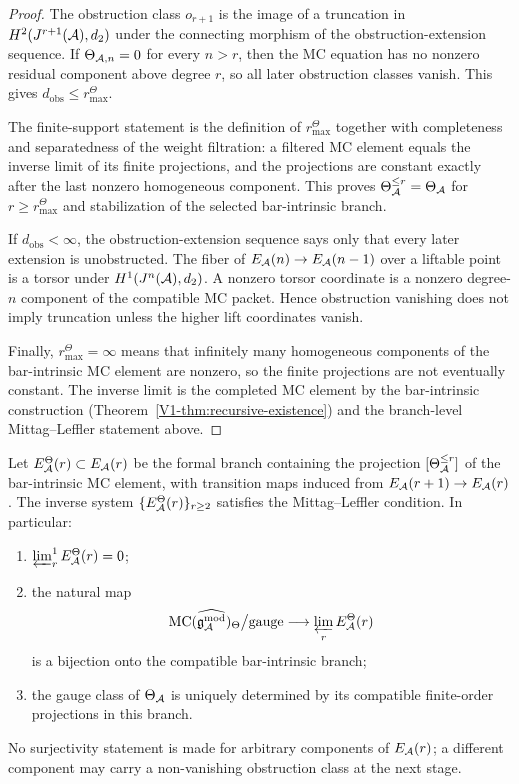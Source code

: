\begin{proof}
The obstruction class \(o_{r+1}\) is the image of a truncation in
\(H^2(J^{r+1}(\mathcal{A}),d_2)\) under the connecting morphism of the
obstruction-extension sequence.  If \(\Theta_{\mathcal{A},n}=0\) for every
\(n>r\), then the MC equation has no nonzero residual component above
degree \(r\), so all later obstruction classes vanish.  This gives
\(d_{\mathrm{obs}}\le r^\Theta_{\max}\).

The finite-support statement is the definition of
\(r^\Theta_{\max}\) together with completeness and separatedness of the
weight filtration: a filtered MC element equals the inverse limit of
its finite projections, and the projections are constant exactly after
the last nonzero homogeneous component.  This proves
\(\Theta_{\mathcal{A}}^{\le r}=\Theta_{\mathcal{A}}\) for
\(r\ge r^\Theta_{\max}\) and stabilization of the selected
bar-intrinsic branch.

If \(d_{\mathrm{obs}}<\infty\), the obstruction-extension sequence says
only that every later extension is unobstructed.  The fiber of
\(E_{\mathcal{A}}(n)\to E_{\mathcal{A}}(n-1)\) over a liftable point is a torsor under
\(H^1(J^n(\mathcal{A}),d_2)\).  A nonzero torsor coordinate is a nonzero
degree-\(n\) component of the compatible MC packet.  Hence obstruction
vanishing does not imply truncation unless the higher lift coordinates
vanish.

Finally, \(r^\Theta_{\max}=\infty\) means that infinitely many
homogeneous components of the bar-intrinsic MC element are nonzero, so
the finite projections are not eventually constant.  The inverse limit
is the completed MC element by the bar-intrinsic construction
(Theorem~\ref{V1-thm:recursive-existence}) and the branch-level
Mittag--Leffler statement above.
\end{proof}

\begin{corollary}
Let \(E^\Theta_{\mathcal{A}}(r)\subset E_{\mathcal{A}}(r)\) be the formal branch containing
the projection \([\Theta_{\mathcal{A}}^{\le r}]\) of the bar-intrinsic MC element,
with transition maps induced from \(E_{\mathcal{A}}(r+1)\to E_{\mathcal{A}}(r)\).  The
inverse system \(\{E^\Theta_{\mathcal{A}}(r)\}_{r\ge2}\) satisfies the
Mittag--Leffler condition. In particular:
\begin{enumerate}[label=\textup{(\roman*)}]
\item $\varprojlim^1_r E^\Theta_{\mathcal{A}}(r) = 0$;
\item the natural map
 \[
 \mathrm{MC}(\widehat{\mathfrak{g}_{\mathcal{A}}^{\mathrm{mod}}})_{\Theta}\big/\textup{gauge}
 \longrightarrow
 \varprojlim_r E^\Theta_{\mathcal{A}}(r)
 \]
 is a bijection onto the compatible bar-intrinsic branch;
\item the gauge class of \(\Theta_{\mathcal{A}}\) is uniquely determined by its
 compatible finite-order projections in this branch.
\end{enumerate}
No surjectivity statement is made for arbitrary components of
\(E_{\mathcal{A}}(r)\); a different component may carry a non-vanishing
obstruction class at the next stage.
\end{corollary}

